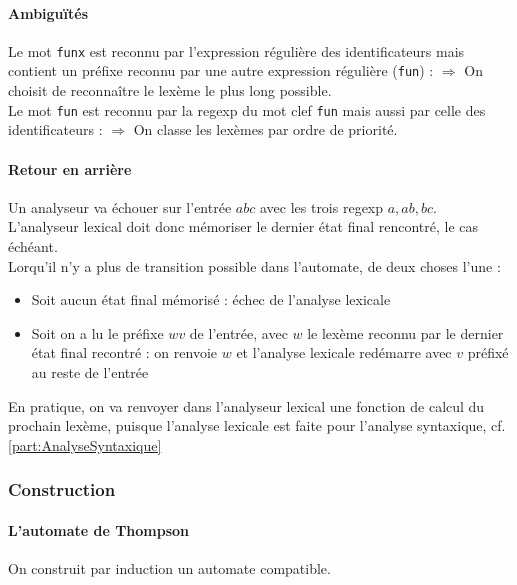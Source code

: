 \documentclass{cours}
\begin{document}
\paragraph*{Ambiguïtés}
Le mot \texttt{funx} est reconnu par l'expression régulière des identificateurs mais contient un préfixe reconnu par une autre expression régulière (\texttt{fun}) : $\Rightarrow$ On choisit de reconnaître le lexème le plus long possible.\\
Le mot \texttt{fun} est reconnu par la regexp du mot clef \texttt{fun} mais aussi par celle des identificateurs : $\Rightarrow$ On classe les lexèmes par ordre de priorité.

\paragraph*{Retour en arrière}
Un analyseur va échouer sur l'entrée $abc$ avec les trois regexp $a, ab, bc$.
L'analyseur lexical doit donc mémoriser le dernier état final rencontré, le cas échéant.\\

Lorqu'il n'y a plus de transition possible dans l'automate, de deux choses l'une :
\begin{itemize}
    \item Soit aucun état final mémorisé : échec de l'analyse lexicale
    \item Soit on a lu le préfixe $wv$ de l'entrée, avec $w$ le lexème reconnu par le dernier état final recontré : on renvoie $w$ et l'analyse lexicale redémarre avec $v$ préfixé au reste de l'entrée
\end{itemize}
En pratique, on va renvoyer dans l'analyseur lexical une fonction de calcul du prochain lexème, puisque l'analyse lexicale est faite pour l'analyse syntaxique, cf. \ref{part:AnalyseSyntaxique}

\subsubsection{Construction}
\paragraph*{L'automate de Thompson}
On construit par induction un automate compatible.
\end{document}
